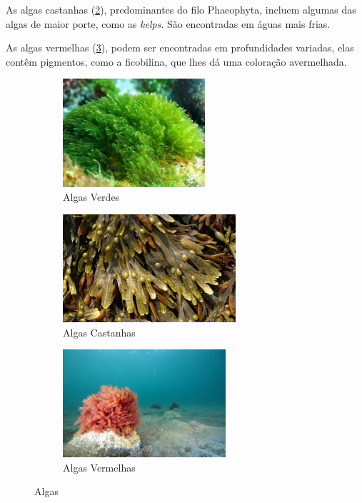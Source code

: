 \documentclass{report}
\begin{document}
As algas castanhas (\ref{fig:algascastanhas}), predominantes do filo Phaeophyta, incluem algumas das algas de maior porte, como as \textit{kelps}. São encontradas em águas mais frias.

As algas vermelhas (\ref{fig:algasvermelhas}), podem ser encontradas em profundidades variadas, elas contêm pigmentos, como a ficobilina, que lhes dá uma coloração avermelhada.	


\begin{figure}[H]
\center
    \begin{subfigure}{.5\textwidth}
    \center
        \includegraphics[height=4cm]{imagens/algasverdes.jpg}
        \caption{Algas Verdes}
        \label{fig:algasverdes}
    \end{subfigure}%
    \hfill
    \begin{subfigure}{.5\textwidth}
    \center
        \includegraphics[height=4cm]{imagens/algascastanhas.jpg}
        \caption{Algas Castanhas}
        \label{fig:algascastanhas}
    \end{subfigure}%
    \hfill
    \begin{subfigure}{.5\textwidth}
    \center    
        \includegraphics[height=4cm]{imagens/algasvermelhas.jpg}
        \caption{Algas Vermelhas}
        \label{fig:algasvermelhas}
    \end{subfigure}
    \caption{Algas}
    \label{fig:algas}
\end{figure}
\end{document}
